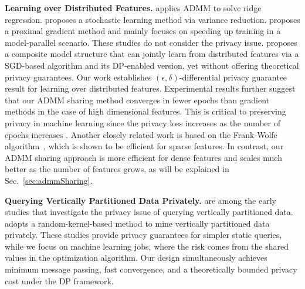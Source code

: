 {\bf Learning over Distributed Features.}
\cite{gratton2018distributed} applies ADMM to solve ridge regression.
\cite{ying2018supervised} proposes a stochastic learning method via variance reduction. \cite{zhou2016convergence} proposes a proximal gradient method and mainly focuses on speeding up training in a model-parallel scenario. These studies do not consider the privacy issue. \cite{hu2019fdml} proposes a composite model structure that can jointly learn from distributed features via a SGD-based algorithm and its DP-enabled version, yet without offering theoretical privacy guarantees. Our work establishes $(\epsilon,\delta)$-differential privacy guarantee result for learning over distributed features. Experimental results further suggest that our ADMM sharing method converges in fewer epochs than gradient methods in the case of high dimensional features. This is critical to preserving privacy in machine learning since the privacy loss increases as the number of epochs increases \cite{dwork2014algorithmic}. Another closely related work is based on the Frank-Wolfe algorithm~\cite{bellet2015distributed,lou2018uplink}, which is shown to be efficient for sparse features. In contrast, our ADMM sharing approach is more efficient for dense features and scales much better as the number of features grows, as will be explained in Sec.~\ref{sec:admmSharing}. %

{\bf Querying Vertically Partitioned Data Privately.} \cite{vaidya2002privacy,dwork2004privacy} are among the early studies that investigate the privacy issue of querying vertically partitioned data. \cite{kenthapadi2013privacy} adopts a random-kernel-based method to mine vertically partitioned data privately. These studies provide privacy guarantees for simpler static queries, while we focus on machine learning jobs, where the risk comes from the shared values in the optimization algorithm. Our design simultaneously achieves minimum message passing, fast convergence, and a theoretically bounded privacy cost under the DP framework.




